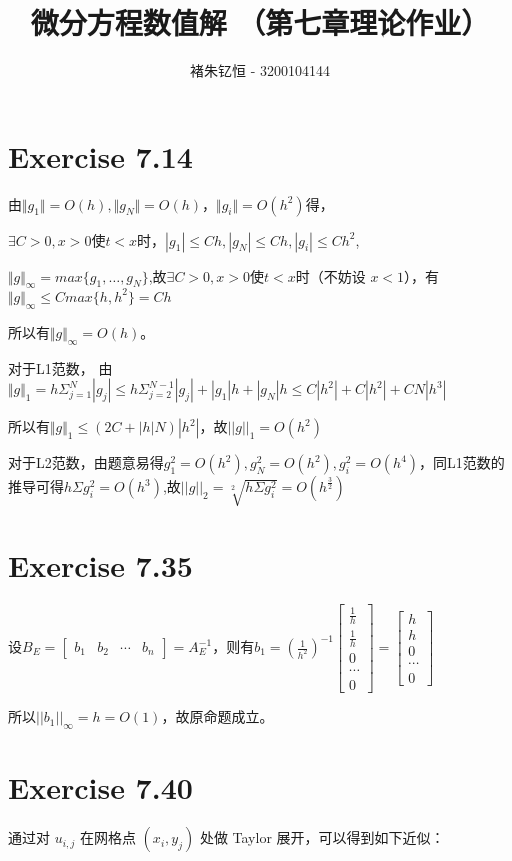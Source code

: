 \documentclass{article}
\title{\Huge \textbf {微分方程数值解 （第七章理论作业）} }
\author{褚朱钇恒 - 3200104144}
\begin{document}
\maketitle

\section{Exercise 7.14}
    由$\Vert g_1 \Vert =O(h),\Vert g_N \Vert =O(h)，\Vert g_i \Vert =O(h^2)$得，

    $\exists C>0,x>0$使$t<x$时，$|g_1|\le Ch,|g_N|\le Ch,|g_i|\le Ch^2$,

    $\Vert g \Vert_\infty=max\{g_1,\dots,g_N\}$,故$\exists C>0,x>0$使$t<x$时（不妨设 $x<1$），有$\Vert g \Vert_\infty\le Cmax\{h,h^2\}=Ch$

    所以有$\Vert g \Vert_\infty=O(h)$。

    对于L1范数，
    由$\Vert g \Vert_1=h\Sigma_{j=1}^N |g_j| \le h\Sigma_{j=2}^{N-1} |g_j|+|g_1|h+|g_N|h\le C|h^2| +C|h^2|+CN|h^3|$

    所以有$\Vert g \Vert_1\le (2C+|h|N)|h^2|$，故$||g||_1=O(h^2)$

    对于L2范数，由题意易得$g_1^2=O(h^2),g_N^2=O(h^2),g_i^2=O(h^4)$，同L1范数的推导可得$h\Sigma g_i^2=O(h^3)$,故$||g||_2=\sqrt[2]{h\Sigma g_i^2}=O(h^{\frac{3}{2}})$

\section{Exercise 7.35}
    设$B_E=\begin{bmatrix}
     b_1 & b_2&\cdots&b_n   
    \end{bmatrix}=A_E^{-1}$，则有$b_1=(\frac{1}{h^2})^{-1}\begin{bmatrix}
        \frac{1}{h}\\
        \frac{1}{h}\\
        0\\
        \cdots\\
        0
    \end{bmatrix}=\begin{bmatrix}
        h\\
        h\\
        0\\
        \cdots\\
        0
    \end{bmatrix}$

    所以$||b_1||_\infty=h=O(1)$，故原命题成立。

\section{Exercise 7.40}
通过对 $u_{i,j}$ 在网格点 $(x_i, y_j)$ 处做 Taylor 展开，可以得到如下近似：
\end{document}
